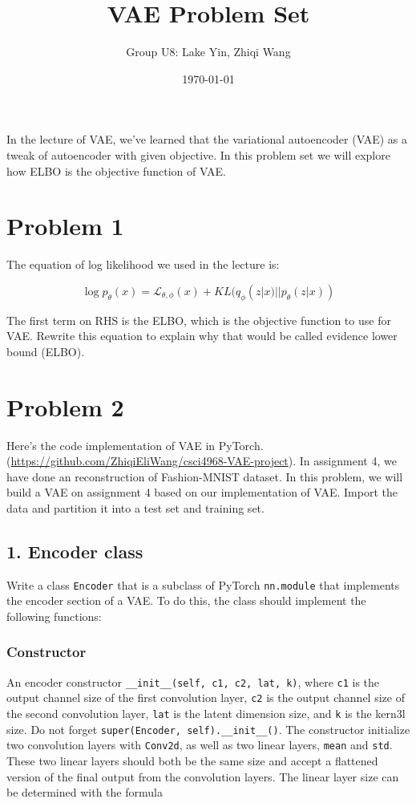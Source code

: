 \documentclass{article}
\begin{document}
\title{\vspace{-3cm}VAE Problem Set}
\author{Group U8: Lake Yin, Zhiqi Wang}
\date{\today}
\maketitle

In the lecture of VAE, we've learned that the variational autoencoder (VAE) as a tweak of autoencoder with given objective. In this problem set we will explore how ELBO is the objective function of VAE.



\section*{Problem 1}

The equation of log likelihood we used in the lecture is:

 $$\log p_\theta (x) = \mathcal{L}_{\theta, \phi}(x) + KL(q_\phi(z|x)||p_\theta(z|x))$$

The first term on RHS is the ELBO, which is the objective function to use for VAE. Rewrite this equation to explain why that would be called evidence lower bound (ELBO).


\section*{Problem 2}

Here's the code implementation of VAE in PyTorch. (\href{https://github.com/ZhiqiEliWang/csci4968-VAE-project}{https://github.com/ZhiqiEliWang/csci4968-VAE-project}). In assignment 4, we have done an reconstruction of Fashion-MNIST dataset. In this problem, we will build a VAE on assignment 4 based on our implementation of VAE. Import the data and partition it into a test set and training set.


\subsection*{1. Encoder class}
Write a class \texttt{Encoder} that is a subclass of PyTorch \texttt{nn.module} that implements the encoder section of a VAE. To do this, the class should implement the following functions:
\subsubsection*{Constructor}
An encoder constructor \texttt{\_\_init\_\_(self, c1, c2, lat, k)}, where \texttt{c1} is the output channel size of the first convolution layer, \texttt{c2} is the output channel size of the second convolution layer, \texttt{lat} is the latent dimension size, and \texttt{k} is the kern3l size. Do not forget \texttt{super(Encoder, self).\_\_init\_\_()}. The constructor initialize two convolution layers with \texttt{Conv2d}, as well as two linear layers, \texttt{mean} and \texttt{std}. These two linear layers should both be the same size and accept a flattened version of the final output from the convolution layers. The linear layer size can be determined with the formula 
\end{document}
